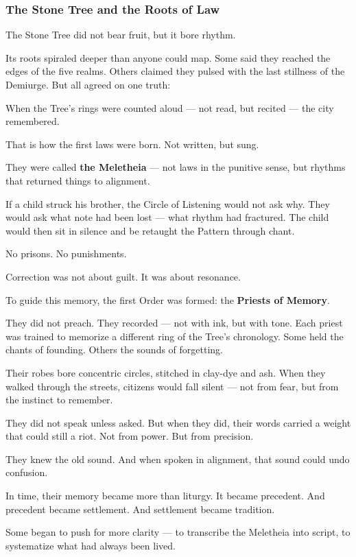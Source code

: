 \documentclass[12pt]{article}
\begin{document}
\subsubsection{The Stone Tree and the Roots of Law}

The Stone Tree did not bear fruit, but it bore rhythm.

Its roots spiraled deeper than anyone could map.  
Some said they reached the edges of the five realms.  
Others claimed they pulsed with the last stillness of the Demiurge.  
But all agreed on one truth:

When the Tree’s rings were counted aloud — not read, but recited —  
the city remembered.

That is how the first laws were born.  
Not written, but sung.

They were called \textbf{the Meletheia} — not laws in the punitive sense,  
but rhythms that returned things to alignment.

If a child struck his brother, the Circle of Listening would not ask why.  
They would ask what note had been lost — what rhythm had fractured.  
The child would then sit in silence and be retaught the Pattern through chant.

No prisons.  
No punishments.

Correction was not about guilt.  
It was about resonance.

To guide this memory, the first Order was formed:  
the \textbf{Priests of Memory}.

They did not preach.  
They recorded — not with ink, but with tone.  
Each priest was trained to memorize a different ring of the Tree’s chronology.  
Some held the chants of founding.  
Others the sounds of forgetting.

Their robes bore concentric circles, stitched in clay-dye and ash.  
When they walked through the streets, citizens would fall silent —  
not from fear,  
but from the instinct to remember.

They did not speak unless asked.  
But when they did, their words carried a weight that could still a riot.  
Not from power.  
But from precision.

They knew the old sound.  
And when spoken in alignment, that sound could undo confusion.

In time, their memory became more than liturgy.  
It became precedent.  
And precedent became settlement.  
And settlement became tradition.

Some began to push for more clarity —  
to transcribe the Meletheia into script,  
to systematize what had always been lived.
\end{document}
